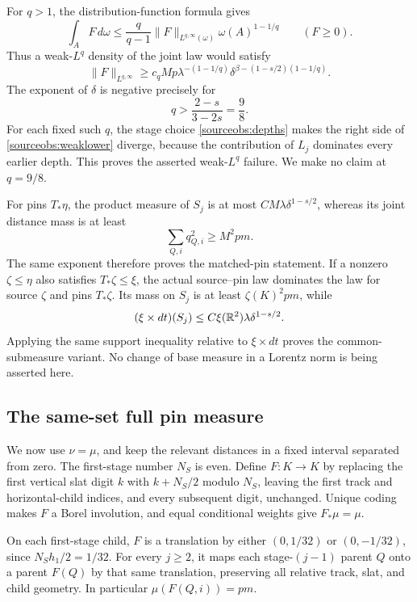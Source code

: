 For \(q>1\), the distribution-function formula gives
\[
 \int_A F\,d\omega
 \le\frac{q}{q-1}\|F\|_{L^{q,\infty}(\omega)}
                  \omega(A)^{1-1/q}
 \qquad(F\ge0).
\]
Thus a weak-\(L^q\) density of the joint law would satisfy
\begin{equation}\label{sourceobs:weaklower}
 \|F\|_{L^{q,\infty}}\ge
 c_qMp\lambda^{-(1-1/q)}
 \delta^{\beta-(1-s/2)(1-1/q)}.
\end{equation}
The exponent of \(\delta\) is negative precisely for
\[
 q>\frac{2-s}{3-2s}=\frac98.
\]
For each fixed such \(q\), the stage choice
\eqref{sourceobs:depths} makes the right side of
\eqref{sourceobs:weaklower} diverge, because the contribution of
\(L_j\) dominates every earlier depth. This proves the asserted
weak-\(L^q\) failure. We make no claim at \(q=9/8\).

For pins \(T_*\eta\), the product measure of \(S_j\) is at most
\(CM\lambda\delta^{1-s/2}\), whereas its joint distance mass is
at least
\[
 \sum_{Q,i}q_{Q,i}^2\ge M^2pm.
\]
The same exponent therefore proves the matched-pin statement.
If a nonzero \(\zeta\le\eta\) also satisfies \(T_*\zeta\le\xi\),
the actual source--pin law dominates the law for source \(\zeta\)
and pins \(T_*\zeta\). Its mass on \(S_j\) is at least
\(\zeta(K)^2pm\), while
\[
 (\xi\times dt)(S_j)
 \le C\xi(\mathbb R^2)\lambda\delta^{1-s/2}.
\]
Applying the same support inequality relative to \(\xi\times dt\)
proves the common-submeasure variant. No change of base measure
in a Lorentz norm is being asserted here.

\subsection{The same-set full pin measure}

We now use \(\nu=\mu\), and keep the relevant distances in a
fixed interval separated from zero. The first-stage number \(N_S\)
is even. Define \(F:K\to K\) by replacing the first vertical slat
digit \(k\) with \(k+N_S/2\) modulo \(N_S\), leaving the first
track and horizontal-child indices, and every subsequent digit,
unchanged. Unique coding makes \(F\) a Borel involution, and equal
conditional weights give \(F_*\mu=\mu\).

On each first-stage child, \(F\) is a translation by either
\((0,1/32)\) or \((0,-1/32)\), since \(N_Sh_1/2=1/32\).
For every \(j\ge2\), it maps each stage-\((j-1)\) parent \(Q\)
onto a parent \(F(Q)\) by that same translation, preserving
all relative track, slat, and child geometry. In particular
\(\mu(F(Q,i))=pm\).

